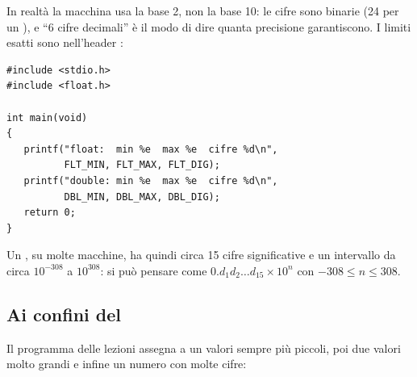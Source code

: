 In realtà la macchina usa la base 2, non la base 10: le cifre sono binarie
(24 per un ), e “6 cifre decimali” è il modo di dire quanta
precisione garantiscono. I limiti esatti sono nell'header :

\begin{lstlisting}[style=c, name=reali.c]
#include <stdio.h>
#include <float.h>

int main(void)
{
   printf("float:  min %e  max %e  cifre %d\n",
          FLT_MIN, FLT_MAX, FLT_DIG);
   printf("double: min %e  max %e  cifre %d\n",
          DBL_MIN, DBL_MAX, DBL_DIG);
   return 0;
}
\end{lstlisting}


Un , su molte macchine, ha quindi circa 15 cifre significative
e un intervallo da circa $10^{-308}$ a $10^{308}$: si può pensare come
$0.d_1 d_2 \dots d_{15} ^{n}$ con $-308 \le n $.

\subsection{Ai confini del }

Il programma delle lezioni assegna a un  valori sempre più
piccoli, poi due valori molto grandi e infine un numero con molte cifre:


